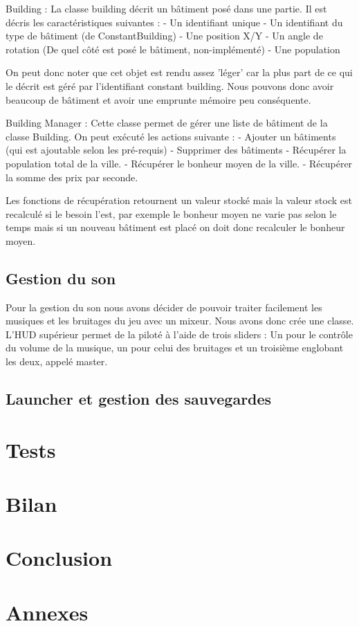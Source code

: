 \documentclass[a4paper,10pt,openany,oneside]{book}
\begin{document}
Building :
La classe building décrit un bâtiment posé dans une partie. Il est décris les caractéristiques suivantes :
	- Un identifiant unique
	- Un identifiant du type de bâtiment (de ConstantBuilding)
	- Une position X/Y
	- Un angle de rotation (De quel côté est posé le bâtiment, non-implémenté)
	- Une population

On peut donc noter que cet objet est rendu assez 'léger' car la plus part de ce qui le décrit est géré par l'identifiant constant building. Nous pouvons donc avoir beaucoup de bâtiment et avoir une emprunte mémoire peu conséquente.

Building Manager :
Cette classe permet de gérer une liste de bâtiment de la classe Building. On peut exécuté les actions suivante :
 - Ajouter un bâtiments (qui est ajoutable selon les pré-requis)
 - Supprimer des bâtiments 
 - Récupérer la population total de la ville.
 - Récupérer le bonheur moyen de la ville.
 - Récupérer la somme des prix par seconde.

Les fonctions de récupération retournent un valeur stocké mais la valeur stock est recalculé si le besoin l'est, par exemple le bonheur moyen ne varie pas selon le temps mais si un nouveau bâtiment est placé on doit donc recalculer le bonheur moyen.

\section{Gestion du son}
Pour la gestion du son nous avons décider de pouvoir traiter facilement les musiques et les bruitages du jeu avec un mixeur. Nous avons donc crée une classe. L'HUD supérieur permet de la piloté à l'aide de trois sliders : Un pour le contrôle du volume de la musique, un pour celui des bruitages et un troisième englobant les deux, appelé master.

\section{Launcher et gestion des sauvegardes}


\chapter{Tests}
\thispagestyle{headings}


\chapter{Bilan}
\thispagestyle{headings}


\chapter{Conclusion}
\thispagestyle{headings}


\chapter{Annexes}
\thispagestyle{headings}
\end{document}
